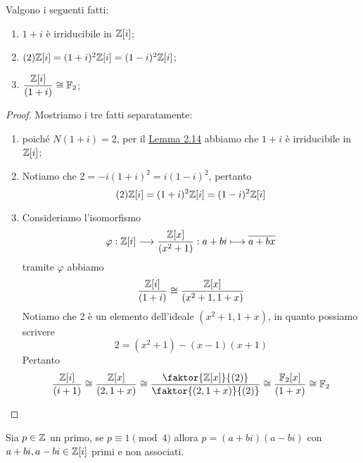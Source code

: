 \documentclass[11pt]{scrartcl}
\begin{document}
\begin{lemma}
    \label{lemma2.15}
    Valgono i seguenti fatti:
    \begin{enumerate}[(1)]
        \item $1 + i$ è irriducibile in $\mathbb Z[i]$;
        \item $(2)\mathbb Z[i] = (1 + i)^2\mathbb Z[i] = (1 - i)^2\mathbb Z[i]$;
        \item $\displaystyle\frac{\mathbb Z[i]}{(1 + i)}\cong \mathbb F_2$;
    \end{enumerate}
\end{lemma}

\begin{proof}Mostriamo i tre fatti separatamente:
    \begin{enumerate}[(1)]
        \item poiché $N(1 + i) = 2$, per il \hyperref[lemma2.14]{Lemma 2.14} abbiamo 
        che $1 + i$ è irriducibile in $\mathbb Z[i]$;
        \item Notiamo che $2 = -i(1 + i)^2 = i(1 - i)^2$, pertanto 
        \[
        (2)\mathbb Z[i] = (1 + i)^2\mathbb Z[i] = (1 - i)^2\mathbb Z[i]
        \]
        \item Consideriamo l'isomorfismo 
        \[
            \varphi: \mathbb Z[i]\longrightarrow \frac{\mathbb Z[x]}{(x^2 + 1)}:
            a + bi \longmapsto \overline{a + bx}
        \]
        tramite $\varphi$ abbiamo
        \[
            \frac{\mathbb Z[i]}{(1 + i)} \cong \frac{\mathbb Z[x]}{(x^2 + 1, 1 + x)}
        \]
        Notiamo che 2 è un elemento dell'ideale $(x^2 + 1, 1 + x)$, in quanto 
        possiamo scrivere
        \[
            2 = (x^2 + 1) - (x-1)(x+1)
        \]
        Pertanto
        \[
            \frac{\ZZ[i]}{(i + 1)} \cong \frac{\ZZ[x]}{(2, 1 + x)} \cong 
            \frac{\faktor{\ZZ[x]}{(2)}}{\faktor{(2, 1 + x)}{(2)}} \cong 
            \frac{\FF_2[x]}{(1 + x)} \cong \FF_2
        \]
    \end{enumerate}
\end{proof}

\begin{lemma}
    \label{lemma2.16}
    Sia $p \in \mathbb Z$ un primo, se $p \equiv 1 \pmod 4$ allora $p = (a + bi)(a - bi)$
    con $a + bi, a - bi \in \mathbb Z[i]$ primi e non associati.
\end{lemma}
\end{document}
